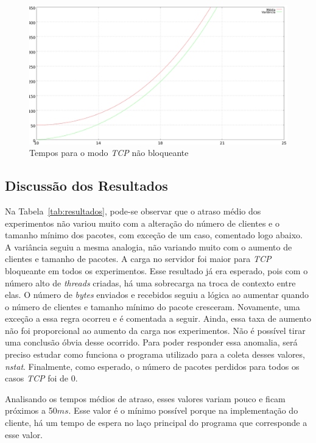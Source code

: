 \documentclass[12pt]{article}
\begin{document}
\begin{figure}[ht]
  \centering
  \includegraphics[width=1\textwidth]{img/tcp-graph.png}
  \caption{Tempos para o modo \emph{TCP} não bloqueante}
  \label{fig:tcp-graph}
\end{figure}

\subsection{Discussão dos Resultados} \label{sub:discussao}

Na Tabela~\ref{tab:resultados}, pode-se observar que o atraso médio dos experimentos não variou muito com a alteração do número de clientes e o tamanho mínimo dos pacotes, com exceção de um caso, comentado logo abaixo. A variância seguiu a mesma analogia, não variando muito com o aumento de clientes e tamanho de pacotes. A carga no servidor foi maior para \emph{TCP} bloqueante em todos os experimentos. Esse resultado já era esperado, pois com o número alto de \emph{threads} criadas, há uma sobrecarga na troca de contexto entre elas. O número de \emph{bytes} enviados e recebidos seguiu a lógica ao aumentar quando o número de clientes e tamanho mínimo do pacote cresceram. Novamente, uma exceção a essa regra ocorreu e é comentada a seguir. Ainda, essa taxa de aumento não foi proporcional ao aumento da carga nos experimentos. Não é possível tirar uma conclusão óbvia desse ocorrido. Para poder responder essa anomalia, será preciso estudar como funciona o programa utilizado para a coleta desses valores, \emph{nstat}. Finalmente, como esperado, o número de pacotes perdidos para todos os casos \emph{TCP} foi de 0.

Analisando os tempos médios de atraso, esses valores variam pouco e ficam próximos a 50$ms$. Esse valor é o mínimo possível porque na implementação do cliente, há um tempo de espera no laço principal do programa que corresponde a esse valor.
\end{document}
